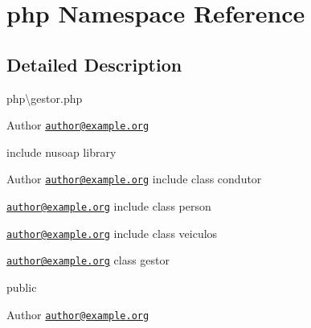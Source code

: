 \hypertarget{namespacephp}{}\section{php Namespace Reference}
\label{namespacephp}


\subsection{Detailed Description}
php\textbackslash{}gestor.\+php

\begin{DoxyAuthor}{Author}
\href{mailto:author@example.org}{\tt author@example.\+org}
\end{DoxyAuthor}
include nusoap library

\begin{DoxyAuthor}{Author}
\href{mailto:author@example.org}{\tt author@example.\+org} include class condutor

\href{mailto:author@example.org}{\tt author@example.\+org} include class person

\href{mailto:author@example.org}{\tt author@example.\+org} include class veiculos

\href{mailto:author@example.org}{\tt author@example.\+org} class gestor
\end{DoxyAuthor}
public \begin{DoxyAuthor}{Author}
\href{mailto:author@example.org}{\tt author@example.\+org} 
\end{DoxyAuthor}
